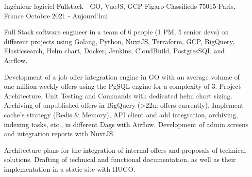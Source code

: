 \cventry
{Ingénieur logiciel Fullstack - GO, VueJS, GCP} %
{Figaro Classifieds} %
{75015 Paris, France} %
{Octobre 2021 - Aujourd'hui} %
{
    \begin{cvitems} %
        \item
        {
            Full Stack software engineer in a team of 6 people (1 PM, 5 senior devs) on different projects using Golang,
            Python, NuxtJS, Terraform, GCP, BigQuery, Elasticsearch, Helm chart, Docker, Jenkins, CloudBuild, PostgresSQL
            and Airflow.
        }
        \item
        {
            Development of a job offer integration engine in GO with an average volume of one million weekly offers using
            the PgSQL engine for a complexity of 3. Project Architecture, Unit Testing and Commands with dedicated helm
            chart sizing. Archiving of unpublished offers in BigQuery (>22m offers currently). Implement cache's strategy
            (Redis \& Memory), API client and add integration, archiving, indexing tasks, etc., in different Dags
            with Airflow. Development of admin screens and integration reports with NuxtJS.
        }
        \item
        {
            Architecture plans for the integration of internal offers and proposals of technical solutions. Drafting of
            technical and functional documentation, as well as their implementation in a static site with HUGO.
        }
    \end{cvitems}
}
